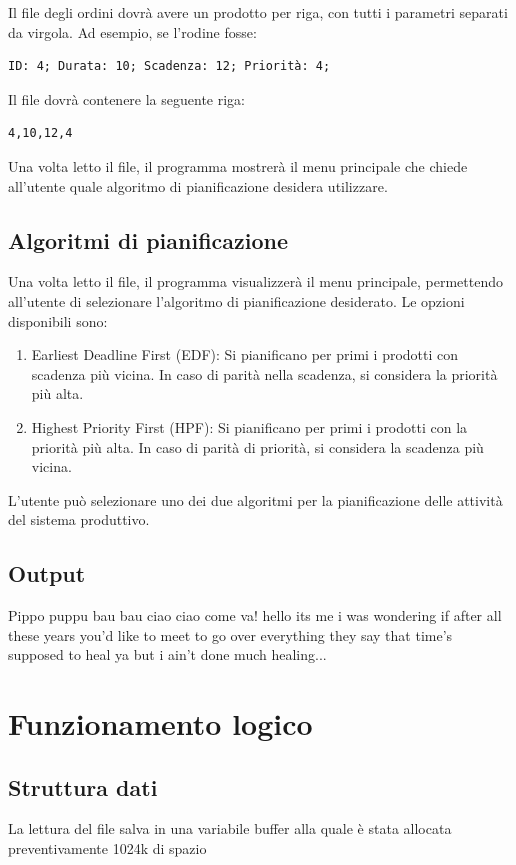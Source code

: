 \documentclass[a4paper]{report}
\begin{document}
Il file degli ordini dovrà avere un prodotto per riga, con tutti i parametri separati da virgola. Ad esempio, se l'rodine fosse:
\begin{verbatim}
ID: 4; Durata: 10; Scadenza: 12; Priorità: 4;
\end{verbatim}
Il file dovrà contenere la seguente riga:
\begin{verbatim}
4,10,12,4
\end{verbatim}

Una volta letto il file, il programma mostrerà il menu principale che chiede all'utente quale algoritmo di pianificazione desidera utilizzare.


\subsection{Algoritmi di pianificazione}
Una volta letto il file, il programma visualizzerà il menu principale, permettendo all'utente di selezionare l'algoritmo di pianificazione desiderato. Le opzioni disponibili sono:

\begin{enumerate}
    \item Earliest Deadline First (EDF): Si pianificano per primi i prodotti con scadenza più vicina. In caso di parità nella scadenza, si considera la priorità più alta.
    \item Highest Priority First (HPF): Si pianificano per primi i prodotti con la priorità più alta. In caso di parità di priorità, si considera la scadenza più vicina.
\end{enumerate}

L'utente può selezionare uno dei due algoritmi per la pianificazione delle attività del sistema produttivo.

\subsection{Output}

Pippo puppu bau bau ciao ciao come va! hello its me i was wondering if after all these years you'd like to meet to go over everything they say that time's supposed to heal ya but i ain't done much healing...
\section{Funzionamento logico}

\subsection{Struttura dati}
La lettura del file salva in una variabile buffer alla quale è stata allocata preventivamente 1024k di spazio
\end{document}
